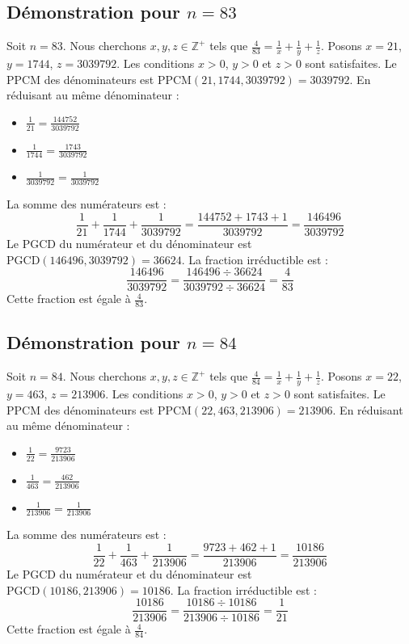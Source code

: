 \documentclass[11pt,a4paper]{article}
\begin{document}
\subsection{Démonstration pour $n = 83$}
Soit $n = 83$. Nous cherchons $x, y, z \in \mathbb{Z}^{+}$ tels que $\frac{4}{83} = \frac{1}{x} + \frac{1}{y} + \frac{1}{z}$.
Posons $x = 21$, $y = 1744$, $z = 3039792$.
Les conditions $x > 0$, $y > 0$ et $z > 0$ sont satisfaites.
Le PPCM des dénominateurs est $\text{PPCM}(21, 1744, 3039792) = 3039792$.
En réduisant au même dénominateur :
\begin{itemize}
    \item $\frac{1}{21} = \frac{144752}{3039792}$
    \item $\frac{1}{1744} = \frac{1743}{3039792}$
    \item $\frac{1}{3039792} = \frac{1}{3039792}$
\end{itemize}
La somme des numérateurs est :
$$ \frac{1}{21} + \frac{1}{1744} + \frac{1}{3039792} = \frac{144752 + 1743 + 1}{3039792} = \frac{146496}{3039792} $$
Le PGCD du numérateur et du dénominateur est $\text{PGCD}(146496, 3039792) = 36624$.
La fraction irréductible est :
$$ \frac{146496}{3039792} = \frac{146496 \div 36624}{3039792 \div 36624} = \frac{4}{83} $$
Cette fraction est égale à $\frac{4}{83}$.

\subsection{Démonstration pour $n = 84$}
Soit $n = 84$. Nous cherchons $x, y, z \in \mathbb{Z}^{+}$ tels que $\frac{4}{84} = \frac{1}{x} + \frac{1}{y} + \frac{1}{z}$.
Posons $x = 22$, $y = 463$, $z = 213906$.
Les conditions $x > 0$, $y > 0$ et $z > 0$ sont satisfaites.
Le PPCM des dénominateurs est $\text{PPCM}(22, 463, 213906) = 213906$.
En réduisant au même dénominateur :
\begin{itemize}
    \item $\frac{1}{22} = \frac{9723}{213906}$
    \item $\frac{1}{463} = \frac{462}{213906}$
    \item $\frac{1}{213906} = \frac{1}{213906}$
\end{itemize}
La somme des numérateurs est :
$$ \frac{1}{22} + \frac{1}{463} + \frac{1}{213906} = \frac{9723 + 462 + 1}{213906} = \frac{10186}{213906} $$
Le PGCD du numérateur et du dénominateur est $\text{PGCD}(10186, 213906) = 10186$.
La fraction irréductible est :
$$ \frac{10186}{213906} = \frac{10186 \div 10186}{213906 \div 10186} = \frac{1}{21} $$
Cette fraction est égale à $\frac{4}{84}$.
\end{document}
